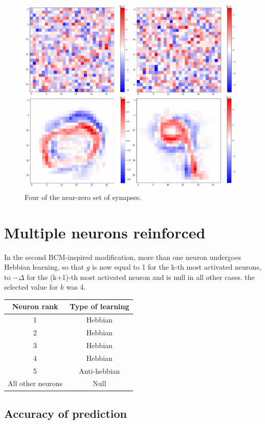 \documentclass[a4paper]{report}
\begin{document}
\begin{figure} [H]
\centering
\includegraphics [width=12cm ] {h/centodue.png}
\caption{Four of the near-zero set of synapses.}
\label{nearzero}
\end{figure}

\section{Multiple neurons reinforced}

In the second BCM-inspired modification, more than one neuron undergoes Hebbian learning, so that $g$ is now equal to 1 for the k-th most activated neurons, to $-\Delta$ for the (k+1)-th most activated neuron and is null in all other cases. the selected value for $k$ was 4.



\begin{center}
	\begin{tabular} {c|c}
		\textbf{Neuron rank} & \textbf{Type of learning} \\
		\hline
		1 & Hebbian \\
		2 & Hebbian \\
		3 & Hebbian \\
		4 & Hebbian \\
		5 & Anti-hebbian \\
		All other neurons & Null \\
	\end{tabular}
\end{center}


\subsection{Accuracy of prediction}
\end{document}
